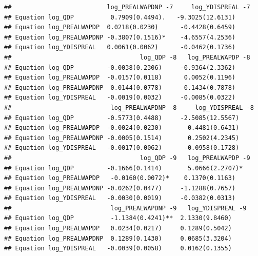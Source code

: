 \documentclass[11pt,preprint, authoryear]{elsarticle}
\numberwithin{equation}{section}
\numberwithin{figure}{section}
\numberwithin{table}{section}
\begin{document}
\begin{verbatim}
##                          log_PREALWAPDNP -7     log_YDISPREAL -7
## Equation log_QDP          0.7909(0.4494).   -9.3025(12.6131)    
## Equation log_PREALWAPDP  0.0218(0.0230)      -0.4428(0.6459)    
## Equation log_PREALWAPDNP -0.3807(0.1516)*    -4.6557(4.2536)    
## Equation log_YDISPREAL   0.0061(0.0062)      -0.0462(0.1736)    
##                                   log_QDP -8   log_PREALWAPDP -8
## Equation log_QDP         -0.0038(0.2306)     -0.9364(2.3362)    
## Equation log_PREALWAPDP  -0.0157(0.0118)      0.0052(0.1196)    
## Equation log_PREALWAPDNP  0.0144(0.0778)      0.1434(0.7878)    
## Equation log_YDISPREAL   -0.0019(0.0032)     -0.0085(0.0322)    
##                           log_PREALWAPDNP -8     log_YDISPREAL -8
## Equation log_QDP         -0.5773(0.4488)     -2.5085(12.5567)    
## Equation log_PREALWAPDP  -0.0024(0.0230)       0.4481(0.6431)    
## Equation log_PREALWAPDNP -0.0005(0.1514)       0.2502(4.2345)    
## Equation log_YDISPREAL   -0.0017(0.0062)      -0.0958(0.1728)    
##                                   log_QDP -9   log_PREALWAPDP -9
## Equation log_QDP         -0.1666(0.1414)       5.0666(2.2707)*  
## Equation log_PREALWAPDP   -0.0160(0.0072)*    0.1370(0.1163)    
## Equation log_PREALWAPDNP -0.0262(0.0477)     -1.1288(0.7657)    
## Equation log_YDISPREAL   -0.0030(0.0019)     -0.0382(0.0313)    
##                           log_PREALWAPDNP -9   log_YDISPREAL -9
## Equation log_QDP          -1.1384(0.4241)**  2.1330(9.8460)    
## Equation log_PREALWAPDP   0.0234(0.0217)     0.1289(0.5042)    
## Equation log_PREALWAPDNP  0.1289(0.1430)     0.0685(3.3204)    
## Equation log_YDISPREAL   -0.0039(0.0058)     0.0162(0.1355)
\end{verbatim}


\end{document}
